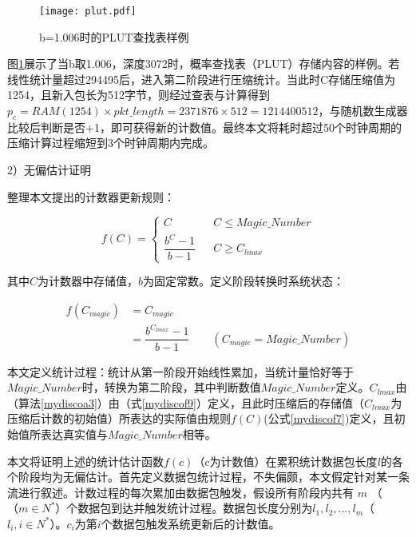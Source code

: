 \begin{figure}[!ht]
	\centering 
	\vspace{-1.5mm}
	\texttt{[image: plut.pdf]}
	\caption{b=1.006时的PLUT查找表样例} \label{fig:plut}
\end{figure}

图\ref{fig:plut}展示了当b取1.006，深度3072时，概率查找表（PLUT）存储内容的样例。若线性统计量超过294495后，进入第二阶段进行压缩统计。当此时C存储压缩值为1254，且新入包长为512字节，则经过查表与计算得到$ p_c=RAM(1254)\times pkt\_length= 2371876 \times 512 = 1214400512 $，与随机数生成器比较后判断是否+1，即可获得新的计数值。最终本文将耗时超过50个时钟周期的压缩计算过程缩短到3个时钟周期内完成。



2）无偏估计证明

整理本文提出的计数器更新规则：

\begin{equation} \label{mydiscof7}
 f(C)=\left\{
\begin{array}{rcl}
C         &      & {C \leq Magic\_Number} \\
\dfrac{b^C-1}{b-1}       &      & {C \geq C_{lmax}}
\end{array} \right. 
\end{equation}

其中$ C $为计数器中存储值，$ b $为固定常数。定义阶段转换时系统状态：


\begin{align}\label{mydiscof9}
f(C_{magic}) &= C_{magic} \nonumber \\
&=\dfrac{b^{C_{lmax}}-1}{b-1} \quad\quad (C_{magic} = Magic\_Number)
\end{align}

本文定义统计过程：统计从第一阶段开始线性累加，当统计量恰好等于$ Magic\_Number $时，转换为第二阶段，其中判断数值$ Magic\_Number $定义。$ C_{lmax} $由（算法\ref{mydiscoa3}）由（式\ref{mydiscof9}）定义，且此时压缩后的存储值（$ C_{lmax} $为压缩后计数的初始值）所表达的实际值由规则$f(C)$(公式\ref{mydiscof7})定义，且初始值所表达真实值与$ Magic\_Number $相等。

本文将证明上述的统计估计函数$f(c)$（c为计数值）在累积统计数据包长度$l$的各个阶段均为无偏估计。首先定义数据包统计过程，不失偏颇，本文假定针对某一条流进行叙述。计数过程的每次累加由数据包触发，假设所有阶段内共有 $ m $ （ $（m\in N^{\ast} $）个数据包到达并触发统计过程。数据包长度分别为$l_1,l_2,\dots,l_m$（$ l_i,i\in N^{\ast} $）。$ c_i $为第$ i $个数据包触发系统更新后的计数值。

